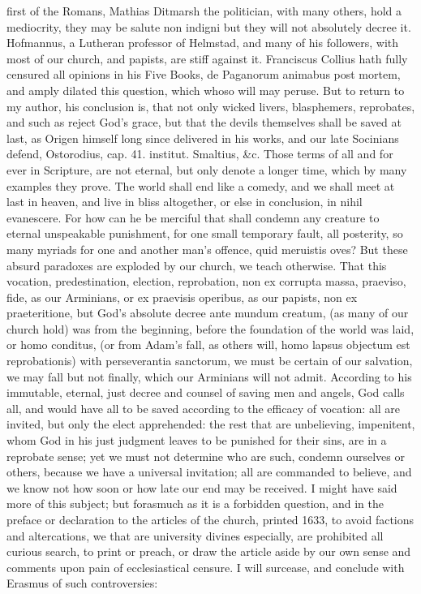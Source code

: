 {first of the Romans, Mathias Ditmarsh the politician, with many others,
hold a mediocrity, they may be salute non indigni but they will not
absolutely decree it. Hofmannus, a Lutheran professor of Helmstad, and
many of his followers, with most of our church, and papists, are stiff
against it. Franciscus Collius hath fully censured all opinions in his
Five Books, de Paganorum animabus post mortem, and amply dilated this
question, which whoso will may peruse. But to return to my author, his
conclusion is, that not only wicked livers, blasphemers, reprobates,
and such as reject God's grace, but that the devils themselves shall be
saved at last, as Origen himself long since delivered in his
works, and our late Socinians defend, Ostorodius, cap. 41.
institut. Smaltius, \&c. Those terms of all and for ever in Scripture,
are not eternal, but only denote a longer time, which by many examples
they prove. The world shall end like a comedy, and we shall meet at
last in heaven, and live in bliss altogether, or else in conclusion, in
nihil evanescere. For how can he be merciful that shall condemn any
creature to eternal unspeakable punishment, for one small temporary
fault, all posterity, so many myriads for one and another man's
offence, quid meruistis oves? But these absurd paradoxes are exploded
by our church, we teach otherwise. That this vocation, predestination,
election, reprobation, non ex corrupta massa, praeviso, fide, as our
Arminians, or ex praevisis operibus, as our papists, non ex
praeteritione, but God's absolute decree ante mundum creatum, (as many
of our church hold) was from the beginning, before the foundation of
the world was laid, or homo conditus, (or from Adam's fall, as others
will, homo lapsus objectum est reprobationis) with perseverantia
sanctorum, we must be certain of our salvation, we may fall but not
finally, which our Arminians will not admit. According to his
immutable, eternal, just decree and counsel of saving men and angels,
God calls all, and would have all to be saved according to the efficacy
of vocation: all are invited, but only the elect apprehended: the rest
that are unbelieving, impenitent, whom God in his just judgment leaves
to be punished for their sins, are in a reprobate sense; yet we must
not determine who are such, condemn ourselves or others, because we
have a universal invitation; all are commanded to believe, and we know
not how soon or how late our end may be received. I might have said
more of this subject; but forasmuch as it is a forbidden question, and
in the preface or declaration to the articles of the church, printed
1633, to avoid factions and altercations, we that are university
divines especially, are prohibited all curious search, to print or
preach, or draw the article aside by our own sense and comments upon
pain of ecclesiastical censure. I will surcease, and conclude with
Erasmus of such controversies: 

}
